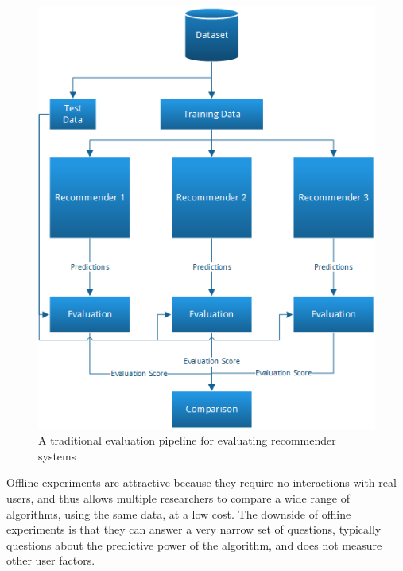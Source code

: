 \begin{figure}[H]
		\centering
	  	\includegraphics[scale=0.6]{image/evaluationpipeline.png}
		\caption[A Traditional Evaluation Pipeline]{A traditional evaluation pipeline for evaluating recommender systems}
		\label{figure:evaluationpipeline}
\end{figure}

Offline experiments are attractive because they require no interactions with
real users, and thus allows multiple researchers to compare a wide range of
algorithms, using the same data, at a low cost. The downside of offline
experiments is that they can answer a very narrow set of questions, typically
questions about the predictive power of the algorithm, and does not measure
other user factors.

